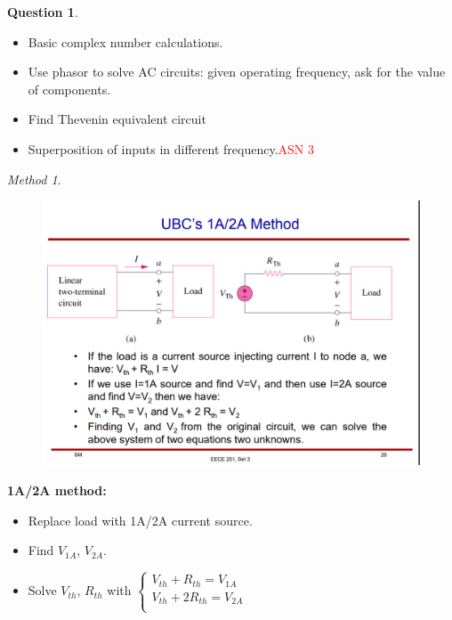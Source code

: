 \documentclass[10pt,landscape]{article}
\newcommand\todo[1]{\textcolor{red}{#1}}
\theoremstyle{definition}
\newtheorem*{question}{Question}
\theoremstyle{remark}
\newtheorem*{method}{Method}
\begin{document}
\begin{multicols}{3}
\begin{question} \mbox{} \\
\begin{itemize}[noitemsep,nolistsep]
    \item Basic complex number calculations.
    \item Use phasor to solve AC circuits: given operating frequency, ask for the value of components.
    \item Find Thevenin equivalent circuit
    \item Superposition of inputs in different frequency.\todo{ASN 3}  
\end{itemize}
\end{question}

\begin{method}
\begin{figure}[H]
    \centering
    \includegraphics[width=\linewidth]{202/figure/1a_2a.png}
    \caption{\cite{251}}
    \label{fig:1a_2a}
\end{figure}

\textbf{1A/2A method: }
\begin{itemize}[noitemsep,nolistsep]
    \item Replace load with 1A/2A current source. 
    \item Find $V_{1A}$, $V_{2A}$.
    \item Solve $V_{th}$, $R_{th}$ with 
    $\begin{cases}
    V_{th} + R_{th} = V_{1A}\\
    V_{th} + 2R_{th} = V_{2A}\\
    \end{cases}$
\end{itemize}
\end{method}


\end{multicols}
\end{document}
